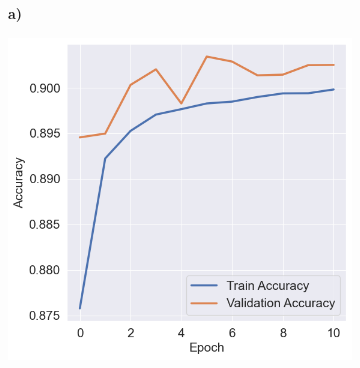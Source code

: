 
\begin{figure}[!htbp]

    \begin{center}

    \begin{minipage}[b]{0.5\textwidth}
        \centering
        \begin{subfigure}[t]{0.06\textwidth}
            \textbf{a)}
        \end{subfigure}
        \begin{subfigure}[t]{0.9\textwidth}
            \includegraphics[width=\linewidth, valign=t]{images/Model_Training/Initial_Training_History_square.png}
        \end{subfigure}
    \end{minipage}%
    \begin{minipage}[b]{0.5\textwidth}

\end{minipage}
\end{center}
\end{figure}
